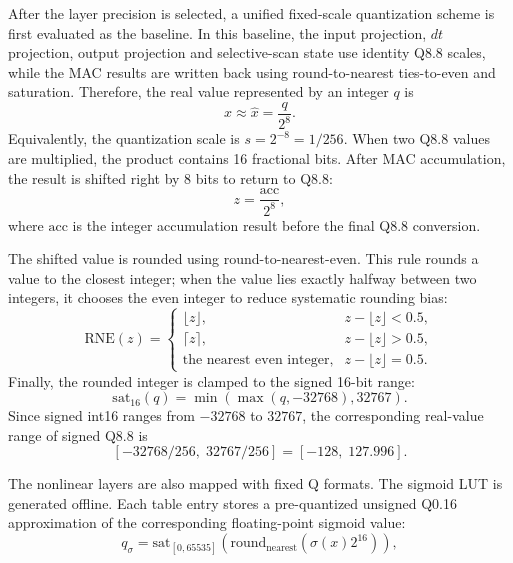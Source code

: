 \documentclass[11pt,twoside]{eitExjobb}
\begin{document}
After the layer precision is selected, a unified fixed-scale quantization scheme is first
evaluated as the baseline. In this baseline, the input projection, \(dt\) projection, output
projection and selective-scan state use identity Q8.8 scales, while the MAC results are written back using
round-to-nearest ties-to-even and saturation. Therefore, the real value represented by an
integer \(q\) is
\begin{equation}
x \approx \hat{x} = \frac{q}{2^8}.
\label{eq:q88_value}
\end{equation}
Equivalently, the quantization scale is \(s=2^{-8}=1/256\). When two Q8.8 values
are multiplied, the product contains 16 fractional bits. After MAC accumulation,
the result is shifted right by 8 bits to return to Q8.8:
\begin{equation}
z = \frac{\mathrm{acc}}{2^8},
\label{eq:q88_mac_shift}
\end{equation}
where \(\mathrm{acc}\) is the integer accumulation result before the final Q8.8
conversion.

The shifted value is rounded using round-to-nearest-even. This rule rounds a
value to the closest integer; when the value lies exactly halfway between two
integers, it chooses the even integer to reduce systematic rounding bias:
\begin{equation}
\mathrm{RNE}(z)=
\begin{cases}
\lfloor z \rfloor, & z-\lfloor z \rfloor < 0.5,\\
\lceil z \rceil, & z-\lfloor z \rfloor > 0.5,\\
\text{the nearest even integer}, & z-\lfloor z \rfloor = 0.5.
\end{cases}
\label{eq:rne}
\end{equation}
Finally, the rounded integer is clamped to the signed 16-bit range:
\begin{equation}
\mathrm{sat}_{16}(q)
=
\min(\max(q,-32768),32767).
\label{eq:sat16}
\end{equation}
Since signed int16 ranges from \(-32768\) to \(32767\), the corresponding
real-value range of signed Q8.8 is
\[
[-32768/256,\;32767/256] = [-128,\;127.996].
\]


The nonlinear layers are also mapped with fixed Q formats. The sigmoid LUT is generated
offline. Each table entry stores a pre-quantized unsigned Q0.16 approximation of
the corresponding floating-point sigmoid value:
\begin{equation}
q_{\sigma} =
\mathrm{sat}_{[0,65535]}
\left(
\mathrm{round}_{\mathrm{nearest}}
\left(
\sigma(x)2^{16}
\right)
\right),
\label{eq:sigmoid_lut_quant}
\end{equation}
\end{document}
